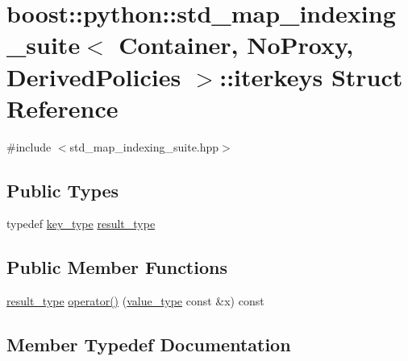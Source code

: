 \hypertarget{structboost_1_1python_1_1std__map__indexing__suite_1_1iterkeys}{}\section{boost\+:\+:python\+:\+:std\+\_\+map\+\_\+indexing\+\_\+suite$<$ Container, No\+Proxy, Derived\+Policies $>$\+:\+:iterkeys Struct Reference}
\label{structboost_1_1python_1_1std__map__indexing__suite_1_1iterkeys}


{\ttfamily \#include $<$std\+\_\+map\+\_\+indexing\+\_\+suite.\+hpp$>$}

\subsection*{Public Types}
\begin{DoxyCompactItemize}
\item 
typedef \hyperlink{classboost_1_1python_1_1std__map__indexing__suite_a4e2daeb60a58d6ce9964e0ea27680009}{key\+\_\+type} \hyperlink{structboost_1_1python_1_1std__map__indexing__suite_1_1iterkeys_a7c12b5aeae081d2ecf524e29e5a5c343}{result\+\_\+type}
\end{DoxyCompactItemize}
\subsection*{Public Member Functions}
\begin{DoxyCompactItemize}
\item 
\hyperlink{structboost_1_1python_1_1std__map__indexing__suite_1_1iterkeys_a7c12b5aeae081d2ecf524e29e5a5c343}{result\+\_\+type} \hyperlink{structboost_1_1python_1_1std__map__indexing__suite_1_1iterkeys_a0e3b853fc4bbcc4777e5c663cc8bdd60}{operator()} (\hyperlink{classboost_1_1python_1_1std__map__indexing__suite_aff9ed68cf30e805a04a313d92c62ab38}{value\+\_\+type} const \&x) const 
\end{DoxyCompactItemize}


\subsection{Member Typedef Documentation}
\hypertarget{structboost_1_1python_1_1std__map__indexing__suite_1_1iterkeys_a7c12b5aeae081d2ecf524e29e5a5c343}{}
